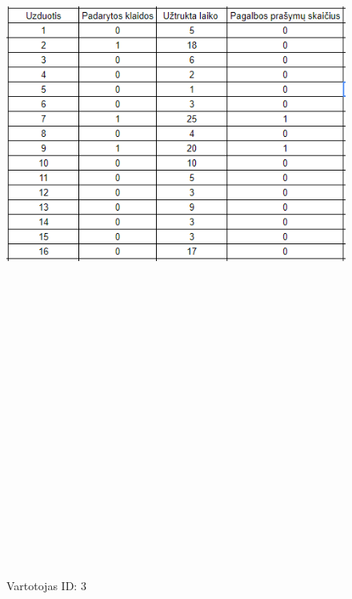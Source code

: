 \documentclass[oneside]{VUMIFPSkursinis}
\begin{document}
	\begin{figure}[ht]
			\centering
			\includegraphics[width=15cm,height=60cm,keepaspectratio]{3.png}
			\caption{ Vartotojas ID: 3}
	\end{figure}
\pagebreak
	
\end{document}
